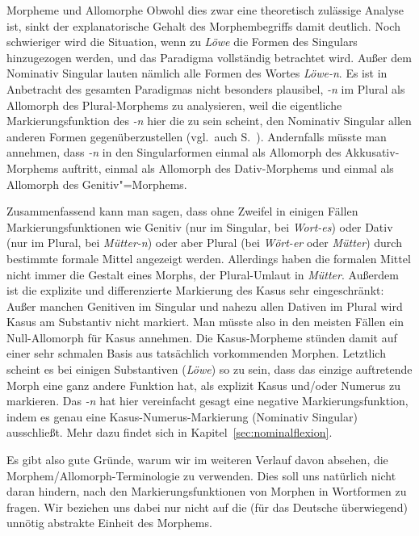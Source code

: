 \begin{Vertiefung}{Morpheme und Allomorphe}
Obwohl dies zwar eine theoretisch zulässige Analyse ist, sinkt der explanatorische Gehalt des Morphembegriffs damit deutlich.
Noch schwieriger wird die Situation, wenn zu \textit{Löwe} die Formen des Singulars hinzugezogen werden, und das Paradigma vollständig betrachtet wird.
Außer dem Nominativ Singular lauten nämlich alle Formen des Wortes \textit{Löwe-n}.
Es ist in Anbetracht des gesamten Paradigmas nicht besonders plausibel, \textit{-n} im Plural als Allomorph des Plural-Morphems zu analysieren, weil die eigentliche Markierungsfunktion des \textit{-n} hier die zu sein scheint, den Nominativ Singular allen anderen Formen gegenüberzustellen (vgl.\ auch S.~\pageref{abs:4578239547}).
Andernfalls müsste man annehmen, dass \textit{-n} in den Singularformen einmal als Allomorph des Akkusativ-Morphems auftritt, einmal als Allomorph des Dativ-Morphems und einmal als Allomorph des Genitiv"=Morphems.


Zusammenfassend kann man sagen, dass ohne Zweifel in einigen Fällen Markierungsfunktionen wie Genitiv (nur im Singular, \zB bei \textit{Wort-es}) oder Dativ (nur im Plural, \zB bei \textit{Mütter-n}) oder aber Plural (\zB bei \textit{Wört-er} oder \textit{Mütter}) durch bestimmte formale Mittel angezeigt werden.
Allerdings haben die formalen Mittel nicht immer die Gestalt eines Morphs, \zB der Plural-Umlaut in \textit{Mütter}.
Außerdem ist die explizite und differenzierte Markierung des Kasus sehr eingeschränkt:
Außer manchen Genitiven im Singular und nahezu allen Dativen im Plural wird Kasus am Substantiv nicht markiert.
Man müsste also in den meisten Fällen ein Null-Allomorph für Kasus annehmen.
Die Kasus-Morpheme stünden damit auf einer sehr schmalen Basis aus tatsächlich vorkommenden Morphen.
Letztlich scheint es bei einigen Substantiven (\zB \textit{Löwe}) so zu sein, dass das einzige auftretende Morph eine ganz andere Funktion hat, als explizit Kasus und\slash oder Numerus zu markieren.
Das \textit{-n} hat hier vereinfacht gesagt eine negative Markierungsfunktion, indem es genau eine Kasus-Numerus-Markierung (Nominativ Singular) ausschließt.
Mehr dazu findet sich in Kapitel~\ref{sec:nominalflexion}.

Es gibt also gute Gründe, warum wir im weiteren Verlauf davon absehen, die Morphem\slash Allomorph-Terminologie zu verwenden.
Dies soll uns natürlich nicht daran hindern, nach den Markierungsfunktionen von Morphen in Wortformen zu fragen.
Wir beziehen uns dabei nur nicht auf die (für das Deutsche überwiegend) unnötig abstrakte Einheit des Morphems.

\end{Vertiefung}

